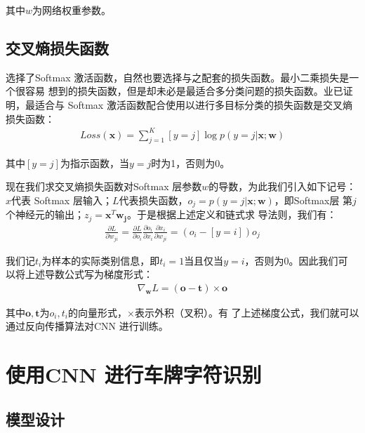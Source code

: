 其中$w$为网络权重参数。

\subsection{交叉熵损失函数}

选择了Softmax 激活函数，自然也要选择与之配套的损失函数。最小二乘损失是一个很容易
想到的损失函数，但是却未必是最适合多分类问题的损失函数。业已证明，最适合与
Softmax 激活函数配合使用以进行多目标分类的损失函数是交叉熵损失函数：
\begin{equation}
\begin{aligned}
Loss(\mathbf{x}) = \sum_{j=1}^{K}[y = j]\log{p(y=j|\mathbf{x};\mathbf{w})}
\end{aligned}
\end{equation}

其中$[y = j]$为指示函数，当$y = j$时为1，否则为0。

现在我们求交叉熵损失函数对Softmax 层参数$w$的导数，为此我们引入如下记号：$x$代表
Softmax 层输入；$L$代表损失函数，$o_j = p(y=j|\mathbf{x};\mathbf{w})$，即Softmax层
第$j$个神经元的输出；$z_j = \mathbf{x}^T\mathbf{w_j}$。于是根据上述定义和链式求
导法则，我们有：
\begin{equation}
\begin{aligned}
\frac{\partial{L}}{\partial{w_{ji}}}  = 
\frac{\partial{L}}{\partial{o_i}}\frac{\partial{o_i}}{\partial{x_i}}\frac{\partial{x_i}}{\partial{w_{ji}}}
=  (o_i-[y = i])o_j
\end{aligned}
\end{equation}

我们记$t_i$为样本的实际类别信息，即$t_i = 1$当且仅当$y = i$，否则为0。因此我们可
以将上述导数公式写为梯度形式：
\begin{equation}
\begin{aligned}
\nabla_{\mathbf{w}}{L} = (\mathbf{o} - \mathbf{t}) \times \mathbf{o}
\end{aligned}
\end{equation}

其中$\mathbf{o}, \mathbf{t}$为$o_i, t_i$的向量形式，$\times$表示外积（叉积）。有
了上述梯度公式，我们就可以通过反向传播算法对CNN 进行训练。

\section{使用CNN 进行车牌字符识别}

\subsection{模型设计}


